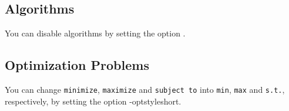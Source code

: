\documentclass[11pt, a4paper]{article}
\begin{document}
\subsection{Algorithms}

You can disable algorithms by setting the option .

\begin{cnltxexample}
  \begin{algorithmic}[1]
    \EndFor
  \end{algorithmic}
\end{cnltxexample}

\subsection{Optimization Problems}

You can change \texttt{minimize}, \texttt{maximize} and \texttt{subject to} into \texttt{min}, \texttt{max} and \texttt{s.t.}, respectively, by setting the option \keyis-{optstyle}{short}.

\begin{cnltxexample}
\end{cnltxexample}
\end{document}
